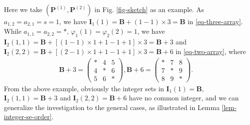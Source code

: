 \documentclass[onecolumn,10pt]{IEEEtran}
\theoremstyle{mythm}
\begin{document}
{\begin{itemize}
 Here we take  $\left(\mathbf{P}^{(1)}, \mathbf{P}^{(2)} \right)$ in Fig. \ref{fig-sketch} as an example. As $a_{1,2}=a_{2,1}=s=1$, we have $\mathbf{I}_1(1)=\mathbf{B}+(1-1)\times3=\mathbf{B}$ in \eqref{eq-three-array}. While $a_{1,1}=a_{2,2}=*$, $\varphi_{1}(1)=\varphi_{2}(2)=1$, we have $\mathbf{I}_2(1,1)=\mathbf{B}+[(1-1)\times1+1-1+1]\times3=\mathbf{B}+3$ and $\mathbf{I}_2(2,2)=\mathbf{B}+[(2-1)\times1+1-1+1]\times3=\mathbf{B}+6$ in \eqref{eq-two-array}, where
\begin{eqnarray}
\label{eq-two-array}
\mathbf{B}+3=\left(
\begin{array}{ccc}
*	&	4	&	5\\
4	&	*	&	6\\
5	&	6	&	*
\end{array}
\right),
\mathbf{B}+6=\left(
\begin{array}{ccc}
*	&	7	&	8\\
7	&	*	&	9\\
8	&	9	&	*
\end{array}
\right).
\end{eqnarray}
From the above example, obviously the integer sets in $\mathbf{I}_1(1)=\mathbf{B}$, $\mathbf{I}_2(1,1)=\mathbf{B}+3$ and $\mathbf{I}_2(2,2)=\mathbf{B}+6$ have no common integer, and we can generalize the investigation to the general cases, as illustrated in Lemma \ref{lem-integer-se-order}.



\end{itemize}}
\end{document}
